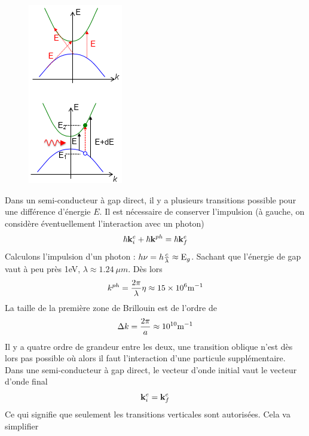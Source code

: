 		\newpage
		\begin{figure}
		\includegraphics[scale=0.85]{ch5/image18}
		\end{figure}
		Dans un semi-conducteur à gap direct, il y a plusieurs transitions possible pour une 
		différence d'énergie $E$. Il est nécessaire de conserver l'impulsion (à gauche, on considère
		éventuellement l'interaction avec un photon)
		\begin{equation}
		\hbar {\bf{k}}_i^e + \hbar {{\bf{k}}^{ph}} = \hbar {\bf{k}}_f^e
		\end{equation}
		Calculons l'impulsion d'un photon : $h\nu  = h\frac{c}{\lambda } \approx {{\rm{E}}_g}$. 
		Sachant que l'énergie de gap vaut à peu près 1eV, $\lambda\approx1.24\ \mu m$. Dès lors
		\begin{equation}
		{k^{ph}} = \frac{{2\pi }}{\lambda }\eta  \approx 15 \times {10^6}{\rm{ }}{{\rm{m}}^{{\rm{ -
		1}}}}
		\end{equation}
		La taille de la première zone de Brillouin est de l'ordre de 
		\begin{equation}
		\Delta k = \frac{{2\pi }}{a} \approx {10^{10}}{\rm{ }}{{\rm{m}}^{{\rm{ - 1}}}}
		\end{equation}				
		Il y a quatre ordre de grandeur entre les deux, une transition oblique n'est dès lors pas
		possible où alors il faut l'interaction d'une particule supplémentaire. Dans une 
		semi-conducteur à gap direct, le vecteur d'onde initial vaut le vecteur d'onde final
		\begin{equation}
		{\bf{k}}_i^e = {\bf{k}}_f^e
		\end{equation}
		Ce qui signifie que seulement les transitions verticales sont autorisées. Cela va simplifier
